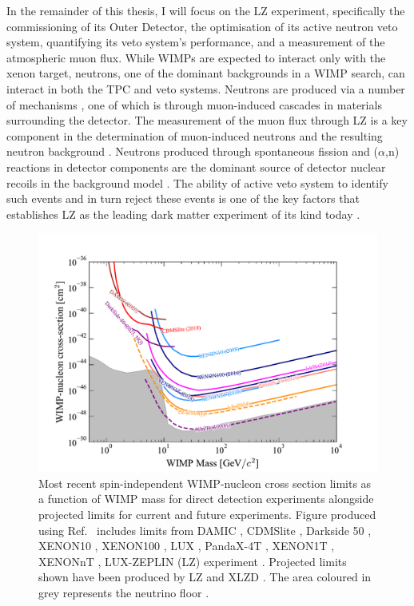 In the remainder of this thesis, I will focus on the LZ experiment, specifically the commissioning of its Outer Detector, the optimisation of its active neutron veto system, quantifying its veto system's performance, and a measurement of the atmospheric muon flux. While WIMPs are expected to interact only with the xenon target, neutrons, one of the dominant backgrounds in a WIMP search, can interact in both the TPC and veto systems. Neutrons are produced via a number of mechanisms \cite{Kudryavtsev:2020eer}, one of which is through muon-induced cascades in materials surrounding the detector. The measurement of the muon flux through LZ is a key component in the determination of muon-induced neutrons and the resulting neutron background \cite{LZ:2022ysc}. Neutrons produced through spontaneous fission and ($\alpha$,n) reactions in detector components are the dominant source of detector nuclear recoils in the background model \cite{LZ:2024zvo,LZ:2022ysc}. The ability of active veto system to identify such events and in turn reject these events is one of the key factors that establishes LZ as the leading dark matter experiment of its kind today \cite{LZ:2024zvo}. 

\begin{figure}[ht!]
    \centering
    \includegraphics[width=\linewidth]{figures/DMOverview/allwimp_limits.pdf}
    \caption[Most recent spin-independent WIMP-nucleon cross section limits as a function of WIMP mass.]{Most recent spin-independent WIMP-nucleon cross section limits as a function of WIMP mass for direct detection experiments alongside projected limits for current and future experiments. Figure produced using Ref.~\cite{DDLimitRepo} includes limits from DAMIC \cite{DAMIC:2020cut}, CDMSlite \cite{SuperCDMS:2017nns}, Darkside 50 \cite{DarkSide:2018bpj}, XENON10 \cite{XENON:2007uwm}, XENON100 \cite{XENON100:2016sjq}, LUX \cite{LUX:2016ggv}, PandaX-4T \cite{PandaX-4T:2021bab}, XENON1T \cite{XENON:2018voc}, XENONnT \cite{XENON:2025vwd}, LUX-ZEPLIN (LZ) experiment \cite{LZCollaboration:2024lux}. Projected limits shown have been produced by LZ \cite{LZ:2018qzl} and XLZD \cite{XLZD:2024nsu}. The area coloured in grey represents the neutrino floor \cite{Billard:2013qya}.}
    \label{fig:DMOverview/WIMPCrossSec.pdf}
\end{figure}